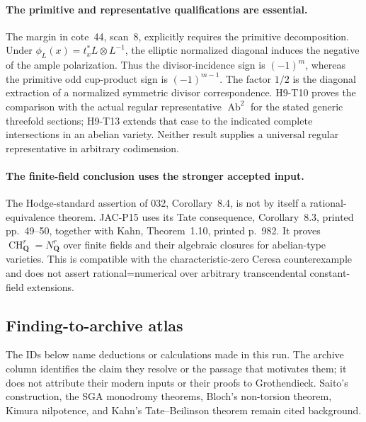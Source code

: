 \paragraph{The primitive and representative qualifications are essential.}
The margin in cote~44, scan~8, explicitly requires the primitive
decomposition. Under $\phi_L(x)=t_x^*L\otimes L^{-1}$, the
elliptic normalized diagonal induces the negative of the ample
polarization. Thus the divisor-incidence sign is $(-1)^m$,
whereas the primitive odd cup-product sign is $(-1)^{m-1}$.
The factor $1/2$ is the diagonal extraction of a normalized
symmetric divisor correspondence. H9-T10 proves the comparison
with the actual regular representative $\operatorname{Ab}^2$
for the stated generic threefold sections; H9-T13 extends that
case to the indicated complete intersections in an abelian variety.
Neither result supplies a universal regular representative in
arbitrary codimension.

\paragraph{The finite-field conclusion uses the stronger accepted input.}
The Hodge-standard assertion of 032, Corollary~8.4, is not by
itself a rational-equivalence theorem. JAC-P15 uses its Tate
consequence, Corollary~8.3, printed pp.~49--50, together with
Kahn, Theorem~1.10, printed p.~982. It proves
$\operatorname{CH}^r_{\mathbf Q}=N^r_{\mathbf Q}$ over finite
fields and their algebraic closures for abelian-type varieties.
This is compatible with the characteristic-zero Ceresa
counterexample and does not assert rational=numerical over
arbitrary transcendental constant-field extensions.

\subsection*{Finding-to-archive atlas}

The IDs below name deductions or calculations made in this run.
The archive column identifies the claim they resolve or the
passage that motivates them; it does not attribute their modern
inputs or their proofs to Grothendieck. Saito's construction,
the SGA monodromy theorems, Bloch's non-torsion theorem, Kimura
nilpotence, and Kahn's Tate--Beilinson theorem remain cited
background.

